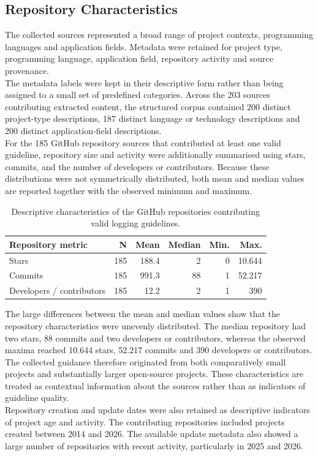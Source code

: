 \subsection{Repository Characteristics}

The collected sources represented a broad range of project contexts, programming
languages and application fields. Metadata were retained for project type,
programming language, application field, repository activity and source provenance.
\\
The metadata labels were kept in their descriptive form rather than being assigned
to a small set of predefined categories. Across the 203 sources contributing extracted content,
the structured corpus contained 200 distinct project-type descriptions, 187 distinct
language or technology descriptions and 200 distinct application-field
descriptions.
\\
For the 185 GitHub repository sources that contributed at least one valid guideline,
repository size and activity were additionally summarised using stars, commits, and
the number of developers or contributors. Because these distributions were not
symmetrically distributed, both mean and median values are reported together with
the observed minimum and maximum.

\begin{table}[H]
    \centering

    \begin{tabular}{lrrrrr}
        \toprule
        \textbf{Repository metric} &
        \textbf{N} &
        \textbf{Mean} &
        \textbf{Median} &
        \textbf{Min.} &
        \textbf{Max.} \\
        \midrule
        Stars & 185 & 188.4 & 2 & 0 & 10.644 \\
        Commits & 185 & 991.3 & 88 & 1 & 52.217 \\
        Developers / contributors & 185 & 12.2 & 2 & 1 & 390 \\
        \bottomrule
    \end{tabular}

    \caption{Descriptive characteristics of the GitHub repositories contributing
    valid logging guidelines.}
    \label{tab:repository-metadata-summary}
\end{table}

The large differences between the mean and median values show that the repository
characteristics were unevenly distributed. The median repository had two stars, 88
commits and two developers or contributors, whereas the observed maxima reached
10.644 stars, 52.217 commits and 390 developers or contributors. The collected
guidance therefore originated from both comparatively small projects and
substantially larger open-source projects. These characteristics are treated as
contextual information about the sources rather than as indicators of guideline
quality.
\\
Repository creation and update dates were also retained as descriptive indicators
of project age and activity. The contributing repositories included projects
created between 2014 and 2026. The available update metadata also showed a large
number of repositories with recent activity, particularly in 2025 and 2026.


